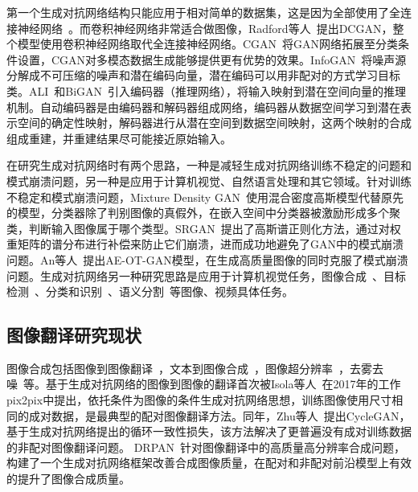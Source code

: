 第一个生成对抗网络结构只能应用于相对简单的数据集，这是因为全部使用了全连接神经网络~\cite{goodfellow2014generative}。而卷积神经网络非常适合做图像，Radford等人~\cite{radford2015unsupervised}提出DCGAN，整个模型使用卷积神经网络取代全连接神经网络。CGAN~\cite{mirza2014conditional}将GAN网络拓展至分类条件设置，CGAN对多模态数据生成能够提供更有优势的效果。InfoGAN~\cite{chen2016infogan}将噪声源分解成不可压缩的噪声和潜在编码向量，潜在编码可以用非配对的方式学习目标类。ALI~\cite{donahue2016adversarial}和BiGAN~\cite{zhang2018bidirectional}引入编码器（推理网络），将输入映射到潜在空间向量的推理机制。自动编码器是由编码器和解码器组成网络，编码器从数据空间学习到潜在表示空间的确定性映射，解码器进行从潜在空间到数据空间映射，这两个映射的合成组成重建，并重建结果尽可能接近原始输入。

在研究生成对抗网络时有两个思路，一种是减轻生成对抗网络训练不稳定的问题和模式崩溃问题，另一种是应用于计算机视觉、自然语言处理和其它领域。针对训练不稳定和模式崩溃问题，Mixture Density GAN~\cite{eghbal2019mixture}使用混合密度高斯模型代替原先的模型，分类器除了判别图像的真假外，在嵌入空间中分类器被激励形成多个聚类，判断输入图像属于哪个类型。SRGAN~\cite{liu2019spectral}提出了高斯谱正则化方法，通过对权重矩阵的谱分布进行补偿来防止它们崩溃，进而成功地避免了GAN中的模式崩溃问题。An等人~\cite{an2020ae}提出AE-OT-GAN模型，在生成高质量图像的同时克服了模式崩溃问题。生成对抗网络另一种研究思路是应用于计算机视觉任务，图像合成~\cite{wang2019discriminative}、目标检测~\cite{wang2017fast}、分类和识别~\cite{oza2020multiple,fang2020generate,jung2020icaps}、语义分割~\cite{luc2016semantic}等图像、视频具体任务。

\subsection{图像翻译研究现状}

图像合成包括图像到图像翻译~\cite{isola2017image}，文本到图像合成~\cite{zhu2019dm}，图像超分辨率~\cite{hyun2020varsr,lee2020journey}，去雾去噪~\cite{shao2020domain,wan2020reflection}等。基于生成对抗网络的图像到图像的翻译首次被Isola等人~\cite{isola2017image}在2017年的工作pix2pix中提出，依托条件为图像的条件生成对抗网络思想，训练图像使用尺寸相同的成对数据，是最典型的配对图像翻译方法。同年，Zhu等人~\cite{zhu2017unpaired}提出CycleGAN，基于生成对抗网络提出的循环一致性损失，该方法解决了更普遍没有成对训练数据的非配对图像翻译问题。
DRPAN~\cite{wang2019discriminative}针对图像翻译中的高质量高分辨率合成问题，构建了一个生成对抗网络框架改善合成图像质量，在配对和非配对前沿模型上有效的提升了图像合成质量。

